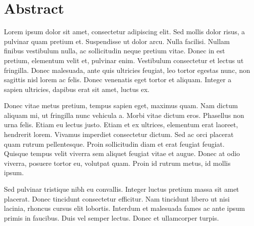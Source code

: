 \chapter*{Abstract}

Lorem ipsum dolor sit amet, consectetur adipiscing elit. Sed mollis dolor risus, a pulvinar quam pretium et. Suspendisse ut dolor arcu. Nulla facilisi. Nullam finibus vestibulum nulla, ac sollicitudin neque pretium vitae. Donec in est pretium, elementum velit et, pulvinar enim. Vestibulum consectetur et lectus ut fringilla. Donec malesuada, ante quis ultricies feugiat, leo tortor egestas nunc, non sagittis nisl lorem ac felis. Donec venenatis eget tortor et aliquam. Integer a sapien ultricies, dapibus erat sit amet, luctus ex.

Donec vitae metus pretium, tempus sapien eget, maximus quam. Nam dictum aliquam mi, ut fringilla nunc vehicula a. Morbi vitae dictum eros. Phasellus non urna felis. Etiam eu lectus justo. Etiam et ex ultrices, elementum erat laoreet, hendrerit lorem. Vivamus imperdiet consectetur dictum. Sed ac orci placerat quam rutrum pellentesque. Proin sollicitudin diam et erat feugiat feugiat. Quisque tempus velit viverra sem aliquet feugiat vitae et augue. Donec at odio viverra, posuere tortor eu, volutpat quam. Proin id rutrum metus, id mollis ipsum.

Sed pulvinar tristique nibh eu convallis. Integer luctus pretium massa sit amet placerat. Donec tincidunt consectetur efficitur. Nam tincidunt libero ut nisi lacinia, rhoncus cursus elit lobortis. Interdum et malesuada fames ac ante ipsum primis in faucibus. Duis vel semper lectus. Donec et ullamcorper turpis.